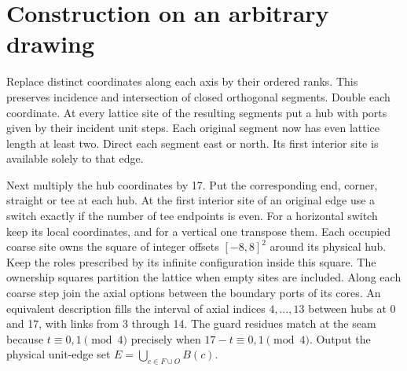 \documentclass[11pt]{article}
\begin{document}
\section{Construction on an arbitrary drawing}
Replace distinct coordinates along each axis by their ordered ranks. This preserves incidence and intersection of closed orthogonal segments. Double each coordinate. At every lattice site of the resulting segments put a hub with ports given by their incident unit steps. Each original segment now has even lattice length at least two. Direct each segment east or north. Its first interior site is available solely to that edge.

Next multiply the hub coordinates by 17. Put the corresponding end, corner, straight or tee at each hub. At the first interior site of an original edge use a switch exactly if the number of tee endpoints is even. For a horizontal switch keep its local coordinates, and for a vertical one transpose them. Each occupied coarse site owns the square of integer offsets \([-8,8]^2\) around its physical hub. Keep the roles prescribed by its infinite configuration inside this square. The ownership squares partition the lattice when empty sites are included. Along each coarse step join the axial options between the boundary ports of its cores. An equivalent description fills the interval of axial indices \(4,\ldots,13\) between hubs at 0 and 17, with links from 3 through 14. The guard residues match at the seam because \(t\equiv0,1\pmod4\) precisely when \(17-t\equiv0,1\pmod4\). Output the physical unit-edge set \(E=\bigcup_{c\in F\cup O}B(c)\).
\end{document}
